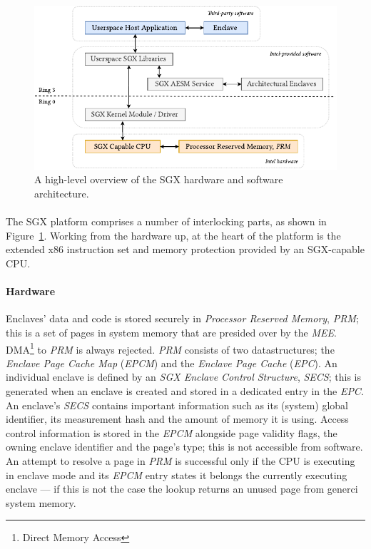 \begin{figure}[]
    \centering
    \includegraphics[width=0.9\linewidth]{figures/SGX-AdvArchitecture.pdf}
    \caption{A high-level overview of the SGX hardware and software architecture.}
    \label{fig:sgx-advarch}
\end{figure}

\paragraph{} The SGX platform comprises a number of interlocking parts, as shown in Figure~\ref{fig:sgx-advarch}. Working from the hardware up, at the heart of the platform is the extended x86 instruction set and memory protection provided by an SGX-capable CPU. 

\paragraph{Hardware} Enclaves' data and code is stored securely in \textit{Processor Reserved Memory}, \textit{PRM}; this is a set of pages in system memory that are presided over by the \textit{MEE}. DMA\footnote{Direct Memory Access} to \textit{PRM} is always rejected. \textit{PRM} consists of two datastructures; the \textit{Enclave Page Cache Map} (\textit{EPCM}) and the \textit{Enclave Page Cache} (\textit{EPC}). An individual enclave is defined by an \textit{SGX Enclave Control Structure}, \textit{SECS}; this is generated when an enclave is created and stored in a dedicated entry in the \textit{EPC}. An enclave's \textit{SECS} contains important information such as its (system) global identifier, its measurement hash and the amount of memory it is using. Access control information is stored in the \textit{EPCM} alongside page validity flags, the owning enclave identifier and the page's type; this is not accessible from software. An attempt to resolve a page in \textit{PRM} is successful only if the CPU is executing in enclave mode and its \textit{EPCM} entry states it belongs the currently executing enclave --- if this is not the case the lookup returns an unused page from generci system memory.

